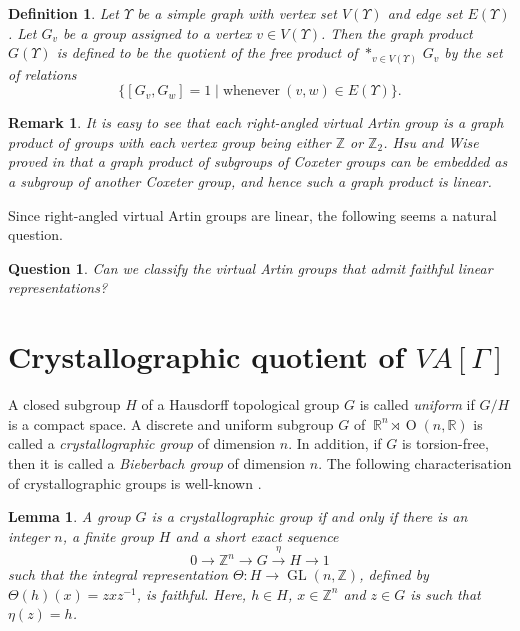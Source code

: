 \documentclass[12pt]{amsart}
\newtheorem{lemma}[equation]{Lemma}
\newtheorem{question}[equation]{Question}
\newtheorem{definition}[equation]{Definition}
\newtheorem{remark}[equation]{Remark}
\numberwithin{equation}{section}
\newcommand{\Oo}{\operatorname{O}}
\newcommand{\GL}{\operatorname{GL}}
\begin{document}
\begin{definition}
Let $\Upsilon$ be a simple graph with vertex set $V(\Upsilon)$ and edge set $E(\Upsilon)$. Let $G_v$ be a group assigned to a vertex $v \in V(\Upsilon)$. Then the graph product $G(\Upsilon)$ is defined to be the quotient of the free product of $*_{v \in V(\Upsilon)} \,G_v$ by the  set of relations
$$
\big\{ [G_v, G_w]=1 \mid  \text{whenever}~ (v,w) \in E(\Upsilon) \big\}.
$$
\end{definition}
\begin{remark}
It is easy to see that each right-angled virtual Artin group is a graph product of groups with each vertex group being either  $\mathbb Z$ or $\mathbb Z_2$. Hsu and Wise proved in \cite{MR1704150} that a graph product of subgroups of  Coxeter groups can be embedded as a subgroup of another Coxeter group, and hence such a graph product is linear.
\end{remark}

Since right-angled virtual Artin groups are linear, the following seems a natural question.

\begin{question}
Can we classify the virtual Artin groups that admit faithful linear representations?
\end{question}
\medskip


\section{Crystallographic quotient of $VA[\Gamma]$}\label{sec crystallographic quotient}

 A closed subgroup $H$ of a Hausdorff topological group $G$ is called {\it uniform} if $G/H$ is a compact space.  A discrete and uniform subgroup $G$ of $~\mathbb{R}^n \rtimes \Oo(n, \mathbb{R})$ is called a {\it crystallographic group} of dimension $n$. In addition, if $G$ is torsion-free, then it is called a {\it Bieberbach group} of dimension $n$. The following characterisation of crystallographic groups is well-known \cite[Lemma 8]{MR3595797}.

\begin{lemma}
 A group $G$ is a crystallographic group if and only if there is an integer $n$, a finite group $H$ and a short exact sequence
$$
0 \longrightarrow \mathbb{Z}^n \longrightarrow G \stackrel{\eta}{\longrightarrow} H \longrightarrow 1
$$
such that the integral representation $\Theta : H \longrightarrow \GL(n, \mathbb{Z})$, defined by $\Theta(h)(x)=z x z^{-1}$, is faithful. Here,  $h \in H$, $x \in \mathbb{Z}^n$ and $z \in G$ is such that $\eta(z)=h$. 
\end{lemma}
\end{document}
